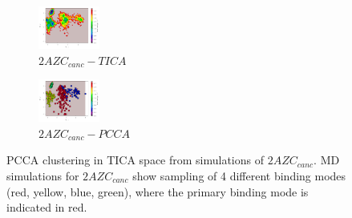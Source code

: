 \begin{figure}[!ht]
\centering
\begin{subfigure}{.5\textwidth}
  \centering
  \includegraphics[width=.9\linewidth]{chapter4/2AZC_canc/2AZC_canc-tica}
  \caption{$2AZC_{canc}-TICA$}
  \label{fig:2AZC_canc-tica}
\end{subfigure}%
\begin{subfigure}{.5\textwidth}
  \centering
  \includegraphics[width=.9\linewidth]{chapter4/2AZC_canc/2AZC_canc-pcca}
  \caption{$2AZC_{canc}-PCCA$}
  \label{fig:2AZC_canc-pcca}
\end{subfigure}
\caption{PCCA clustering in TICA space from simulations of $2AZC_{canc}$. MD simulations for $2AZC_{canc}$ show sampling of 4 different binding modes (red, yellow, blue, green), where the primary binding mode is indicated in red.}
\label{fig:2AZC_canc-cluster}
\end{figure}

